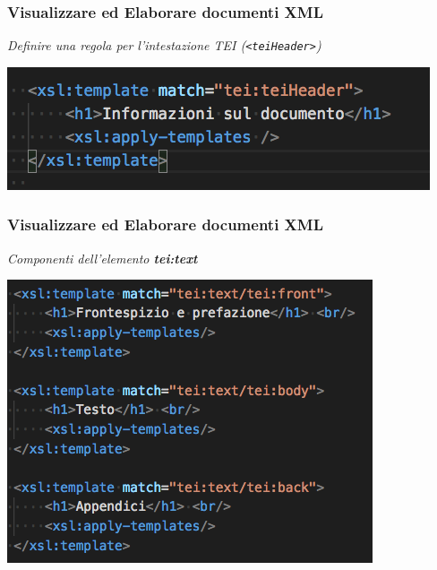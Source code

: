 \begin{frame}
    \frametitle{Visualizzare ed Elaborare documenti XML}
    \addtocounter{nframe}{1}
    
        \textit{Definire una regola per l’intestazione TEI (\texttt{<teiHeader>})}

    \begin{center}
        \includegraphics[width=.8\textwidth]{imgs/EsempioCommentato3.png}
    \end{center}

\end{frame}


\begin{frame}
    \frametitle{Visualizzare ed Elaborare documenti XML}
    \addtocounter{nframe}{1}
    
        \textit{Componenti dell'elemento \textbf{tei:text}}

    \begin{center}
        \includegraphics[width=.8\textwidth]{imgs/EsempioCommentato4.png}
    \end{center}

\end{frame}

